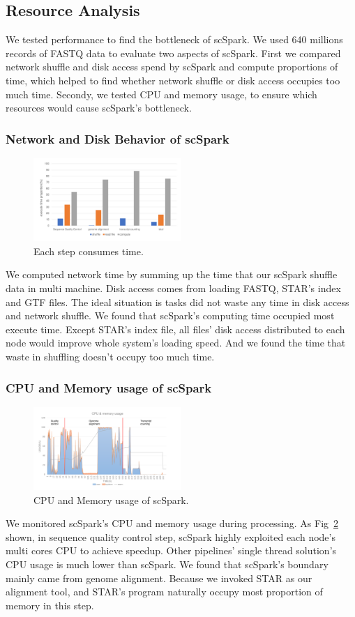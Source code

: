 \documentclass[10pt,journal,compsoc]{IEEEtran}
\begin{document}
\subsection{Resource Analysis}
We tested performance to find the bottleneck of scSpark.
We used 640 millions records of FASTQ data to evaluate two aspects of scSpark.
First we compared network shuffle and disk access spend by scSpark and compute proportions of time, which helped to find whether network shuffle or disk access occupies too much time.
Secondy, we tested CPU and memory usage, to ensure which resources would cause scSpark's bottleneck.

\subsubsection{Network and Disk Behavior of scSpark}
\begin{figure}
	\includegraphics[width=0.5\textwidth]{fig7.pdf}
	\caption{Each step consumes time.} \label{fig7}
\end{figure}
We computed network time by summing up the time that our scSpark shuffle data in multi machine. 
Disk access comes from loading FASTQ, STAR's index and GTF files. 
The ideal situation is tasks did not waste any time in disk access and network shuffle. 
We found that scSpark's computing time occupied most execute time. 
Except STAR's index file, all files' disk access distributed to each node would improve whole system's loading speed. 
And we found the time that waste in shuffling doesn't occupy too much time. 

\subsubsection{CPU and Memory usage of scSpark}
\begin{figure}
	\includegraphics[width=0.5\textwidth]{fig8.pdf}
	\caption{CPU and Memory usage of scSpark.} \label{fig8}
\end{figure}
We monitored scSpark's CPU and memory usage during processing. 
As Fig~\ref{fig8} shown, in sequence quality control step, scSpark highly exploited each node's multi cores CPU to achieve speedup. 
Other pipelines' single thread solution's CPU usage is much lower than scSpark. 
We found that scSpark's boundary mainly came from genome alignment.
Because we invoked STAR as our alignment tool, and STAR's program naturally occupy most proportion of memory in this step.
\end{document}
